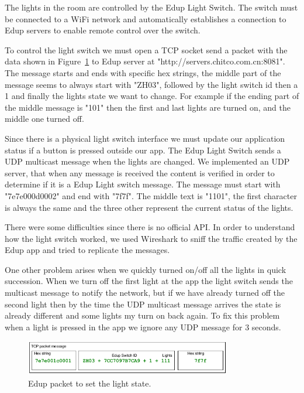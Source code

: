 The lights in the room are controlled by the Edup Light Switch. The switch must be connected to a WiFi network and automatically establishes a connection to Edup servers to enable remote control over the switch.

To control the light switch we must open a \ac{TCP} socket send a packet with the data shown in Figure~\ref{edup_imp} to Edup server at "http://servers.chitco.com.cn:8081".
The message starts and ends with specific hex strings, the middle part of the message seems to always start with "ZH03", followed by the light switch id then a 1 and finally the lights state we want to change. For example if the ending part of the middle message is "101" then the first and last lights are turned on, and the middle one turned off.

Since there is a physical light switch interface we must update our application status if a button is pressed outside our app.
The Edup Light Switch sends a \ac{UDP} multicast message when the lights are changed. We implemented an \ac{UDP} server, that when any message is received the content is verified in order to determine if it is a Edup Light switch message. The message must start with "7e7e000d0002" and end with "7f7f". The middle text is "1101", the first character is always the same and the three other represent the current status of the lights. 


There were some difficulties since there is no official API. In order to understand how the light switch worked, we used Wireshark to sniff the traffic created by the Edup app and tried to replicate the messages.

One other problem arises when we quickly turned on/off all the lights in quick succession. When we turn off the first light at the app the light switch sends the multicast message to notify the network, but if we have already turned off the second light then by the time the \ac{UDP} multicast message arrives the state is already different and some lights my turn on back again. To fix this problem when a light is pressed in the app we ignore any \ac{UDP} message for 3 seconds.


\begin{figure}[h]
\centering
\includegraphics[width=0.8\textwidth]{Figures/Edup_imp}
\caption{Edup packet to set the light state.}
\label{edup_imp}
\end{figure}



